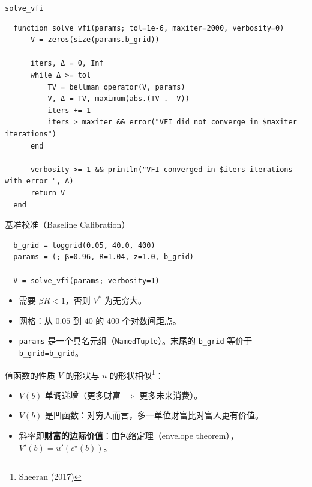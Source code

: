 \documentclass[10pt,aspectratio=169]{beamer}
\begin{document}
\begin{frame}[fragile]{\texttt{solve\_vfi}}
  \begin{lstlisting}
  function solve_vfi(params; tol=1e-6, maxiter=2000, verbosity=0)
      V = zeros(size(params.b_grid))

      iters, Δ = 0, Inf
      while Δ >= tol
          TV = bellman_operator(V, params)
          V, Δ = TV, maximum(abs.(TV .- V))
          iters += 1
          iters > maxiter && error("VFI did not converge in $maxiter iterations")
      end

      verbosity >= 1 && println("VFI converged in $iters iterations with error ", Δ)
      return V
  end
  \end{lstlisting}
\end{frame}

\begin{frame}[fragile]{基准校准（Baseline Calibration）}
  \begin{lstlisting}
  b_grid = loggrid(0.05, 40.0, 400)
  params = (; β=0.96, R=1.04, z=1.0, b_grid)

  V = solve_vfi(params; verbosity=1)
  \end{lstlisting}
  \begin{itemize}
    \item \small 需要 $\beta R < 1$，否则 $V^*$ 为无穷大。
    \item 网格：从 $0.05$ 到 $40$ 的 400 个对数间距点。
    \item \texttt{params} 是一个具名元组（\texttt{NamedTuple}）。末尾的 \texttt{b\_grid} 等价于 \texttt{b\_grid=b\_grid}。
  \end{itemize}
\end{frame}

\begin{frame}{值函数的性质}
  $V$ 的形状与 $u$ 的形状相似\footnote{Sheeran (2017)}：
  \begin{itemize}
    \item $V(b)$ 单调递增（更多财富 $\Rightarrow$ 更多未来消费）。
    \item $V(b)$ 是凹函数：对穷人而言，多一单位财富比对富人更有价值。
    \item 斜率即\textbf{财富的边际价值}：由包络定理（envelope theorem），$V'(b) = u'(c^\star(b))$。
  \end{itemize}
\end{frame}
\end{document}
